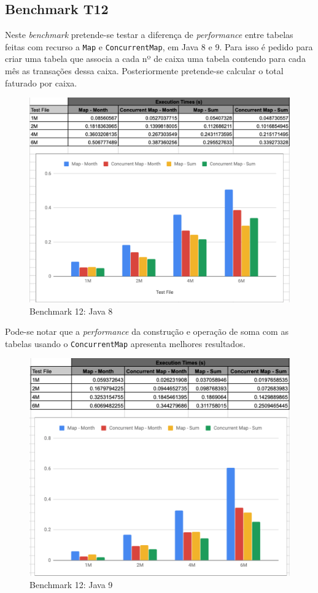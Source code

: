 \documentclass{article}
\begin{document}
\newpage
\subsection{Benchmark T12}

Neste \textit{benchmark} pretende-se testar a diferença de \textit{performance} entre tabelas feitas com recurso a \texttt{Map} e \texttt{ConcurrentMap}, em Java 8 e 9. Para isso é pedido para criar uma tabela que associa a cada nº de caixa uma tabela contendo para cada mês as transações dessa caixa. Posteriormente pretende-se calcular o total faturado por caixa. 
\begin{figure}[H]
    \centering
    \includegraphics[width=15cm]{Pictures/T12_8.png}
    \caption{Benchmark 12: Java 8}
\end{figure}
Pode-se notar que a \textit{performance} da construção e operação de soma com as tabelas usando o \texttt{ConcurrentMap} apresenta melhores resultados.
\begin{figure}[H]
    \centering
    \includegraphics[width=15cm]{Pictures/T12_9.png}
    \caption{Benchmark 12: Java 9}
\end{figure}
\end{document}
